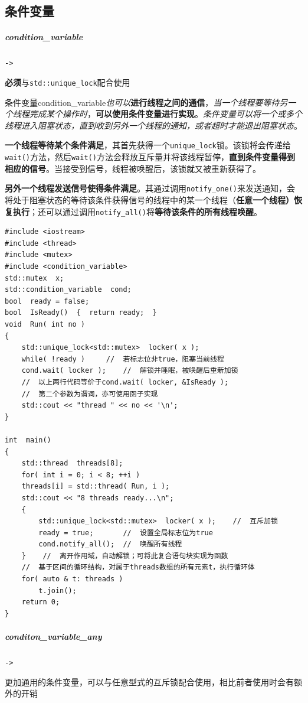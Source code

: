 \documentclass[UTF8,a4paper,12pt]{ctexbook}
\begin{document}
	\subsection{条件变量}
		\subparagraph{condition\_variable}\verb|->|
		
			\textbf{必须}与\verb|std::unique_lock|配合使用
		
			条件变量condition\_variable\textit{也可以}\textbf{进行线程之间的通信}，\textit{当一个线程要等待另一个线程完成某个操作时}，\textbf{可以使用条件变量进行实现}。\textit{条件变量可以将一个或多个线程进入阻塞状态，直到收到另外一个线程的通知，或者超时才能退出阻塞状态}。
			
			\textbf{一个线程等待某个条件满足}，其首先获得一个\verb|unique_lock|锁。该锁将会传递给\verb|wait()|方法，然后\verb|wait()|方法会释放互斥量并将该线程暂停，\textbf{直到条件变量得到相应的信号}。当接受到信号，线程被唤醒后，该锁就又被重新获得了。
			
			\textbf{另外一个线程发送信号使得条件满足}。其通过调用\verb|notify_one()|来发送通知，会将处于阻塞状态的等待该条件获得信号的线程中的某一个线程（\textbf{任意一个线程）恢复执行}；还可以通过调用\verb|notify_all()|将\textbf{等待该条件的所有线程唤醒}。

			\begin{lstlisting}
#include <iostream>
#include <thread>
#include <mutex>
#include <condition_variable>
std::mutex  x;
std::condition_variable  cond;
bool  ready = false;
bool  IsReady()  {  return ready;  }
void  Run( int no )
{
	std::unique_lock<std::mutex>  locker( x );
	while( !ready )		//  若标志位非true，阻塞当前线程
	cond.wait( locker );	//  解锁并睡眠，被唤醒后重新加锁
	//  以上两行代码等价于cond.wait( locker, &IsReady );
	//  第二个参数为谓词，亦可使用函子实现
	std::cout << "thread " << no << '\n';
}

int  main()
{
	std::thread  threads[8];
	for( int i = 0; i < 8; ++i )
	threads[i] = std::thread( Run, i );
	std::cout << "8 threads ready...\n";
	{
		std::unique_lock<std::mutex>  locker( x );    //  互斥加锁
		ready = true;		//  设置全局标志位为true
		cond.notify_all();	//  唤醒所有线程
	}    //  离开作用域，自动解锁；可将此复合语句块实现为函数
	//  基于区间的循环结构，对属于threads数组的所有元素t，执行循环体
	for( auto & t: threads )
		t.join();
	return 0;
}
		\end{lstlisting}
		
		\subparagraph{conditon\_variable\_any} \verb|->|
		
		更加通用的条件变量，可以与任意型式的互斥锁配合使用，相比前者使用时会有额外的开销
		
\end{document}

